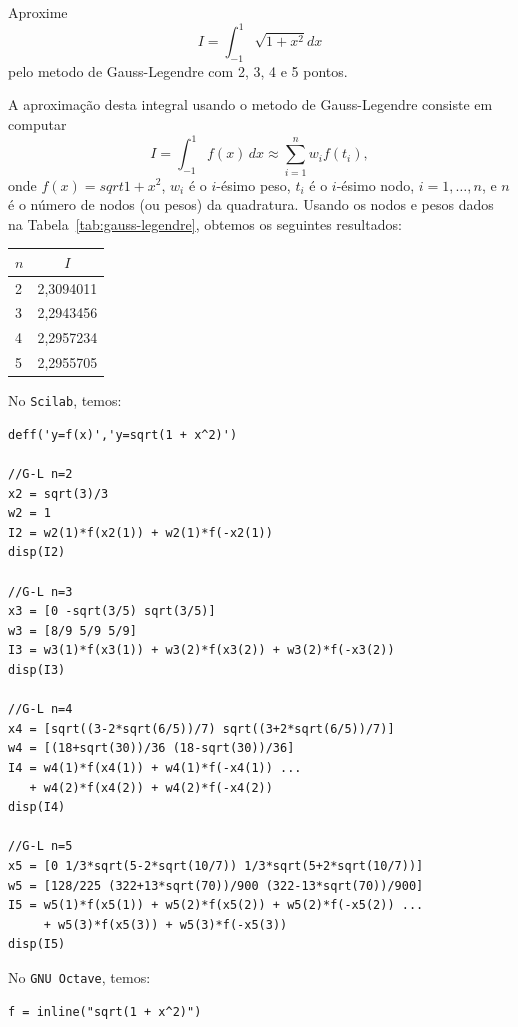 \begin{ex} Aproxime
  \begin{equation*}
    I = \int_{-1}^1\sqrt{1+x^2}dx  
  \end{equation*}
pelo metodo de Gauss-Legendre com 2, 3, 4 e 5 pontos.
\end{ex}
\begin{sol}
  A aproximação desta integral usando o metodo de Gauss-Legendre consiste em computar
  \begin{equation*}
    I = \int_{-1}^1 f(x)\,dx \approx \sum_{i=1}^n w_if(t_i),
  \end{equation*}
onde $f(x) = sqrt{1 + x^2}$, $w_i$ é o $i$-ésimo peso, $t_i$ é o $i$-ésimo nodo, $i=1, \dotsc, n$, e $n$ é o número de nodos (ou pesos) da quadratura. Usando os nodos e pesos dados na Tabela~\ref{tab:gauss-legendre}, obtemos os seguintes resultados:
\begin{center}
  \begin{tabular}{l|c}
    $n$ & $I$ \\\hline
    2 & 2,3094011\\
    3 & 2,2943456\\
    4 & 2,2957234\\
    5 & 2,2955705\\\hline
  \end{tabular}
\end{center}

\ifisscilab
No \verb+Scilab+, temos:
\begin{verbatim}
deff('y=f(x)','y=sqrt(1 + x^2)')

//G-L n=2
x2 = sqrt(3)/3
w2 = 1
I2 = w2(1)*f(x2(1)) + w2(1)*f(-x2(1))
disp(I2)

//G-L n=3
x3 = [0 -sqrt(3/5) sqrt(3/5)]
w3 = [8/9 5/9 5/9]
I3 = w3(1)*f(x3(1)) + w3(2)*f(x3(2)) + w3(2)*f(-x3(2))
disp(I3)

//G-L n=4
x4 = [sqrt((3-2*sqrt(6/5))/7) sqrt((3+2*sqrt(6/5))/7)]
w4 = [(18+sqrt(30))/36 (18-sqrt(30))/36]
I4 = w4(1)*f(x4(1)) + w4(1)*f(-x4(1)) ...
   + w4(2)*f(x4(2)) + w4(2)*f(-x4(2))
disp(I4)

//G-L n=5
x5 = [0 1/3*sqrt(5-2*sqrt(10/7)) 1/3*sqrt(5+2*sqrt(10/7))]
w5 = [128/225 (322+13*sqrt(70))/900 (322-13*sqrt(70))/900]
I5 = w5(1)*f(x5(1)) + w5(2)*f(x5(2)) + w5(2)*f(-x5(2)) ...
     + w5(3)*f(x5(3)) + w5(3)*f(-x5(3))
disp(I5)
\end{verbatim}
\fi 
\ifisoctave
No \verb+GNU Octave+, temos:
\begin{verbatim}
f = inline("sqrt(1 + x^2)")


\end{verbatim}
\end{sol}
